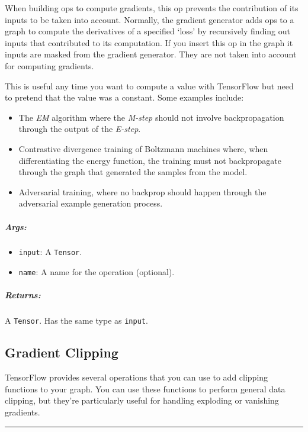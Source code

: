 When building ops to compute gradients, this op prevents the
contribution of its inputs to be taken into account. Normally, the
gradient generator adds ops to a graph to compute the derivatives of a
specified `loss' by recursively finding out inputs that contributed to
its computation. If you insert this op in the graph it inputs are masked
from the gradient generator. They are not taken into account for
computing gradients.

This is useful any time you want to compute a value with TensorFlow but
need to pretend that the value was a constant. Some examples include:

\begin{itemize}
\tightlist
\item
  The \emph{EM} algorithm where the \emph{M-step} should not involve
  backpropagation through the output of the \emph{E-step}.
\item
  Contrastive divergence training of Boltzmann machines where, when
  differentiating the energy function, the training must not
  backpropagate through the graph that generated the samples from the
  model.
\item
  Adversarial training, where no backprop should happen through the
  adversarial example generation process.
\end{itemize}

\subparagraph{Args: }\label{args-12}

\begin{itemize}
\tightlist
\item
  \texttt{input}: A \texttt{Tensor}.
\item
  \texttt{name}: A name for the operation (optional).
\end{itemize}

\subparagraph{Returns: }\label{returns-6}

A \texttt{Tensor}. Has the same type as \texttt{input}.

\subsection{Gradient Clipping }\label{gradient-clipping}

TensorFlow provides several operations that you can use to add clipping
functions to your graph. You can use these functions to perform general
data clipping, but they're particularly useful for handling exploding or
vanishing gradients.

\begin{center}\rule{0.5\linewidth}{\linethickness}\end{center}

